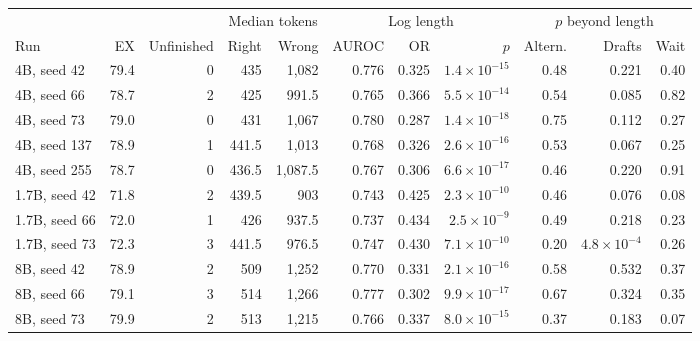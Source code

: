 \begin{tabular}{@{}l rr rr rrr rrr@{}}
\toprule
 & & & \multicolumn{2}{c}{Median tokens} & \multicolumn{3}{c}{Log length} & \multicolumn{3}{c}{$p$ beyond length} \\
\cmidrule(lr){4-5}\cmidrule(lr){6-8}\cmidrule(lr){9-11}
Run & EX & Unfinished & Right & Wrong & AUROC & OR & $p$ & Altern. & Drafts & Wait \\
\midrule
4B, seed 42 & 79.4 & 0 & 435 & 1,082 & 0.776 & 0.325 & $1.4\times10^{-15}$ & 0.48 & 0.221 & 0.40 \\
4B, seed 66 & 78.7 & 2 & 425 & 991.5 & 0.765 & 0.366 & $5.5\times10^{-14}$ & 0.54 & 0.085 & 0.82 \\
4B, seed 73 & 79.0 & 0 & 431 & 1,067 & 0.780 & 0.287 & $1.4\times10^{-18}$ & 0.75 & 0.112 & 0.27 \\
4B, seed 137 & 78.9 & 1 & 441.5 & 1,013 & 0.768 & 0.326 & $2.6\times10^{-16}$ & 0.53 & 0.067 & 0.25 \\
4B, seed 255 & 78.7 & 0 & 436.5 & 1,087.5 & 0.767 & 0.306 & $6.6\times10^{-17}$ & 0.46 & 0.220 & 0.91 \\
1.7B, seed 42 & 71.8 & 2 & 439.5 & 903 & 0.743 & 0.425 & $2.3\times10^{-10}$ & 0.46 & 0.076 & 0.08 \\
1.7B, seed 66 & 72.0 & 1 & 426 & 937.5 & 0.737 & 0.434 & $2.5\times10^{-9}$ & 0.49 & 0.218 & 0.23 \\
1.7B, seed 73 & 72.3 & 3 & 441.5 & 976.5 & 0.747 & 0.430 & $7.1\times10^{-10}$ & 0.20 & $4.8\times10^{-4}$ & 0.26 \\
8B, seed 42 & 78.9 & 2 & 509 & 1,252 & 0.770 & 0.331 & $2.1\times10^{-16}$ & 0.58 & 0.532 & 0.37 \\
8B, seed 66 & 79.1 & 3 & 514 & 1,266 & 0.777 & 0.302 & $9.9\times10^{-17}$ & 0.67 & 0.324 & 0.35 \\
8B, seed 73 & 79.9 & 2 & 513 & 1,215 & 0.766 & 0.337 & $8.0\times10^{-15}$ & 0.37 & 0.183 & 0.07 \\
\bottomrule
\end{tabular}
